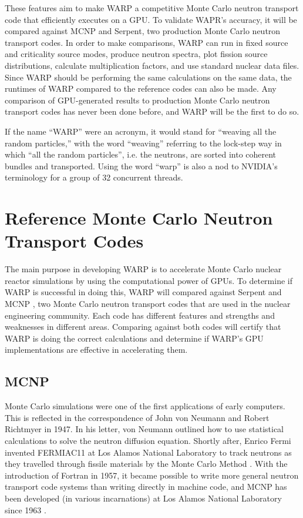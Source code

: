 These features aim to make WARP a competitive Monte Carlo neutron transport code that efficiently executes on a GPU.  To validate WAPR's accuracy, it will be compared against MCNP and Serpent, two production Monte Carlo neutron transport codes.  In order to make comparisons, WARP can run in fixed source and criticality source modes, produce neutron spectra, plot fission source distributions, calculate multiplication factors, and use standard nuclear data files.  Since WARP should be performing the same calculations on the same data, the runtimes of WARP compared to the reference codes can also be made.  Any comparison of GPU-generated results to production Monte Carlo neutron transport codes has never been done before, and WARP will be the first to do so.

If the name ``WARP'' were an acronym, it would stand for ``weaving all the random particles,'' with the word ``weaving'' referring to the lock-step way in which ``all the random particles'', i.e. the neutrons, are sorted into coherent bundles and transported.  Using the word ``warp'' is also a nod to NVIDIA's terminology for a group of 32 concurrent threads.

\section{Reference Monte Carlo Neutron Transport Codes}

The main purpose in developing WARP is to accelerate Monte Carlo nuclear reactor simulations by using the computational power of GPUs.  To determine if WARP is successful in doing this, WARP will compared against Serpent \cite{jaakko} and MCNP \cite{mcnp}, two Monte Carlo neutron transport codes that are used in the nuclear engineering community.  Each code has different features and strengths and weaknesses in different areas. Comparing against both codes will certify that WARP is doing the correct calculations and determine if WARP's GPU implementations are effective in accelerating them.  

\subsection{MCNP}

Monte Carlo simulations were one of the first applications of early computers.   This is reflected in the correspondence of John von Neumann and  Robert Richtmyer  in 1947.  In his letter, von Neumann outlined how to use statistical calculations to solve the neutron diffusion equation.  Shortly after, Enrico Fermi invented FERMIAC11 at Los Alamos National Laboratory to track neutrons as they travelled through fissile materials by the Monte Carlo Method \cite{mcnp}.  With the introduction of Fortran in 1957, it became possible to write more general neutron transport code systems than writing directly in machine code, and MCNP has been developed (in various incarnations) at Los Alamos National Laboratory since 1963 \cite{mcnp}.
 
